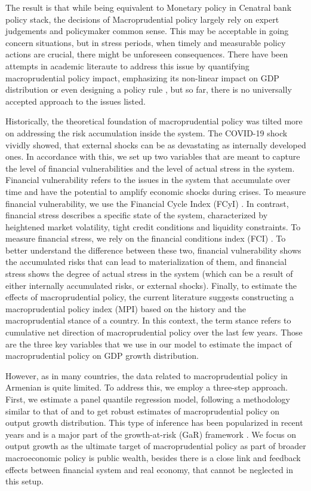 \documentclass[12pt,a4paper]{article}
\begin{document}
The result is that while being equivalent to Monetary policy in Cenatral bank policy stack, the decisions of Macroprudential policy largely rely on expert judgements and policymaker common sense. This may be acceptable in going concern situations, but in stress periods, when timely and measurable policy actions are crucial, there might be unforeseen consequences. There have been attempts in academic literaute to address this issue by quantifying macroprudential policy impact, emphasizing its non-linear impact on GDP distribution \citet{adrian_2019} or even designing a policy rule \citet{suarez2022}, but so far, there is no universally accepted approach to the issues listed.

Historically, the theoretical foundation of macroprudential policy was tilted more on addressing the risk accumulation inside the system. The COVID-19 shock vividly showed, that external shocks can be as devastating as internally developed ones. In accordance with this, we set up two variables that are meant to capture the level of financial vulnerabilities and the level of actual stress in the system. Financial vulnerability refers to the issues in the system that accumulate over time and have the potential to amplify economic shocks during crises. To measure financial vulnerability, we use the Financial Cycle Index (FCyI) \citep{hollo2012, plasil2014}. In contrast, financial stress describes a specific state of the system, characterized by heightened market volatility, tight credit conditions and liquidity constraints. To measure financial stress, we rely on the financial conditions index (FCI) \citep{koop_2013}. To better understand the difference between these two, financial vulnerability shows the accumulated risks that can lead to materialization of them, and financial stress shows the degree of actual stress in the system (which can be a result of either internally accumulated risks, or external shocks). Finally, to estimate the effects of macroprudential policy, the current literature \citep{alam2019, galan2020} suggests constructing a macroprudential policy index (MPI) based on the history and the macroprudential stance of a country. In this context, the term stance refers to cumulative net direction of macroprudential policy over the last few years. Those are the three key variables that we use in our model to estimate the impact of macroprudential policy on GDP growth distribution.

However, as in many countries, the data related to macroprudential policy in Armenian is quite limited. To address this, we employ a three-step approach. First, we estimate a panel quantile regression model, following a methodology similar to that of \citet{galan2020} and \citet{aikman2019} to get robust estimates of macroprudential policy on output growth distribution. This type of inference has been popularized in recent years and is a major part of the growth-at-risk (GaR) framework \citep{esrb2024}. We focus on output growth as the ultimate target of macroprudential policy as part of broader macroeconomic policy is public wealth, besides there is a close link and feedback effects between financial system and real economy, that cannot be neglected in this setup.
\end{document}
